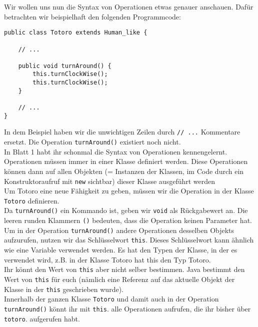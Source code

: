 \begin{Infobox}
    Wir wollen uns nun die Syntax von Operationen etwas genauer anschauen. 
    Dafür betrachten wir beispielhaft den folgenden Programmcode:

    \begin{lstlisting}[numbers=none]
public class Totoro extends Human_like {

    // ...

    public void turnAround() {
        this.turnClockWise();
        this.turnClockWise();
    }

    // ...
}
    \end{lstlisting}

    In dem Beispiel haben wir die unwichtigen Zeilen durch \lstinline{// ...} Kommentare ersetzt.
Die Operation \lstinline{turnAround()} existiert noch nicht.\\

In Blatt 1 habt ihr schonmal die Syntax von Operationen kennengelernt.
Operationen müssen immer in einer Klasse definiert werden.
Diese Operationen können dann auf allen Objekten (= Instanzen
der Klassen, im Code durch ein Konstruktoraufruf mit \lstinline{new} sichtbar) dieser Klasse ausgeführt
werden\\

Um Totoro eine neue Fähigkeit zu geben, müssen wir die Operation in der Klasse \lstinline{Totoro} definieren.\\

Da \lstinline{turnAround()} ein Kommando ist, geben wir \lstinline{void} als Rückgabewert an.
Die leeren runden Klammern \lstinline{()} bedeuten, dass die Operation keinen Parameter hat.\\

Um in der Operation \lstinline{turnAround()} andere Operationen desselben Objekts aufzurufen, nutzen wir das Schlüsselwort \lstinline{this}.
Dieses Schlüsselwort kann ähnlich wie eine Variable verwendet werden. Es hat den Typen der Klasse, in der es verwendet wird, z.B. in der Klasse Totoro hat this den Typ Totoro.\\

Ihr könnt den Wert von \lstinline{this} aber nicht selber bestimmen.
Java bestimmt den Wert von \lstinline{this} für euch (nämlich eine Referenz auf das aktuelle Objekt der Klasse in der \lstinline{this} geschrieben wurde).\\

Innerhalb der ganzen Klasse \lstinline{Totoro} und damit auch in der Operation \lstinline{turnAround()} könnt ihr mit \lstinline{this}. alle Operationen aufrufen, die ihr bisher über \lstinline{totoro}. aufgerufen habt.

\end{Infobox}


